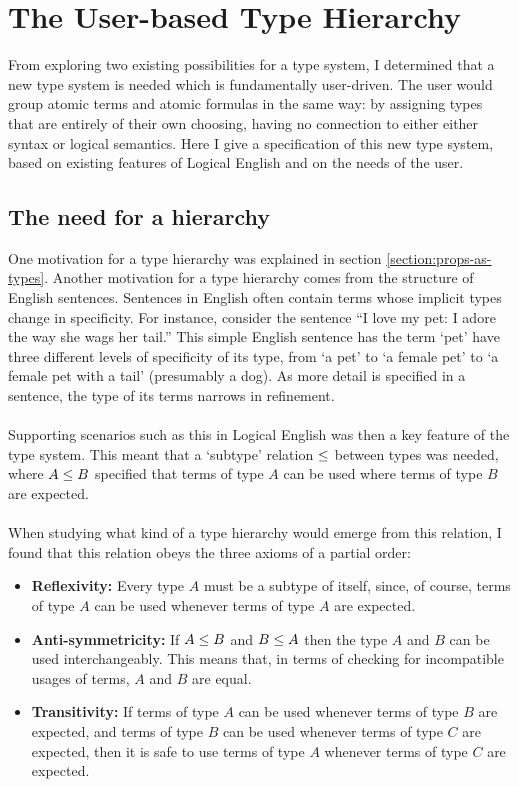 \documentclass[../main.tex]{subfiles}
\begin{document}
\section{The User-based Type Hierarchy}
\label{section:type-hierarchy}
From exploring two existing possibilities for a type system, I determined that a new type system is needed which is fundamentally user-driven. The user would group atomic terms and atomic formulas in the same way: by assigning types that are entirely of their own choosing, having no connection to either either syntax or logical semantics. Here I give a specification of this new type system, based on existing features of Logical English and on the needs of the user.
\subsection{The need for a hierarchy}
One motivation for a type hierarchy was explained in section \ref{section:props-as-types}. Another motivation for a type hierarchy comes from the structure of English sentences. Sentences in English often contain terms whose implicit types change in specificity. 
For instance, consider the sentence ``I love my pet: I adore the way she wags her tail.'' This simple English sentence has the term `pet' have three different levels of specificity of its type, from `a pet' to `a female pet' to `a female pet with a tail' (presumably a dog). As more detail is specified in a sentence, the type of its terms narrows in refinement. 
\\
\\
Supporting scenarios such as this in Logical English was then a key feature of the type system. This meant that a `subtype' relation $\leq$ between types was needed, where $A \leq B$ specified that terms of type $A$ can be used where terms of type $B$ are expected. 
\\
\\
When studying what kind of a type hierarchy would emerge from this relation, I found that this relation obeys the three axioms of a partial order:
\begin{itemize}
    \item \textbf{Reflexivity:} Every type $A$ must be a subtype of itself, since, of course, terms of type $A$ can be used whenever terms of type $A$ are expected.
    \item \textbf{Anti-symmetricity:} If $A \leq B$ and $B \leq A$ then the type $A$ and $B$ can be used interchangeably. This means that, in terms of checking for incompatible usages of terms, $A$ and $B$ are equal. 
    \item \textbf{Transitivity:} If terms of type $A$ can be used whenever terms of type $B$ are expected, and terms of type $B$ can be used whenever terms of type $C$ are expected, then it is safe to use terms of type $A$ whenever terms of type $C$ are expected.
\end{itemize}
\end{document}
